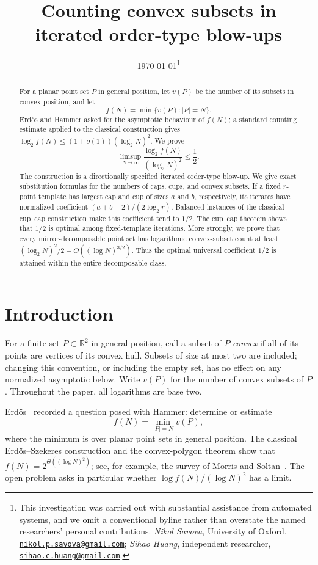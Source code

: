 \documentclass[11pt]{article}
\title{Counting convex subsets in iterated order-type blow-ups}
\author{}
\date{\today\thanks{This investigation was carried out with substantial
assistance from automated systems, and we omit a conventional byline rather
than overstate the named researchers' personal contributions.
\emph{Nikol Savova}, University of Oxford,
\href{mailto:nikol.p.savova@gmail.com}{\texttt{nikol.p.savova@gmail.com}};
\emph{Sihao Huang}, independent researcher,
\href{mailto:sihao.c.huang@gmail.com}{\texttt{sihao.c.huang@gmail.com}}.}}
\theoremstyle{remark}
\begin{document}
\maketitle

\begin{abstract}
For a planar point set $P$ in general position, let $v(P)$ be the number
of its subsets in convex position, and let
\[
 f(N)=\min\{v(P):|P|=N\}.
\]
Erd\H{o}s and Hammer asked for the asymptotic behaviour of $f(N)$; a
standard counting estimate applied to the classical construction gives
$\log_2 f(N)\le (1+o(1))(\log_2N)^2$.
We prove
\[
 \limsup_{N\to\infty}
 \frac{\log_2 f(N)}{(\log_2N)^2}\le\frac12.
\]
The construction is a directionally specified iterated order-type blow-up.
We give exact substitution formulas for the numbers of caps, cups, and
convex subsets.  If a fixed $r$-point template has largest cap and cup of
sizes $a$ and $b$, respectively, its iterates have normalized coefficient
$(a+b-2)/(2\log_2r)$.  Balanced instances of the classical cup--cap
construction make this coefficient tend to $1/2$.  The cup--cap theorem
shows that $1/2$ is optimal among fixed-template iterations.  More strongly,
we prove that every mirror-decomposable point set has logarithmic
convex-subset count at least
$(\log_2N)^2/2-O((\log N)^{3/2})$.  Thus the
optimal universal coefficient $1/2$ is attained within the entire
decomposable class.
\end{abstract}

\section{Introduction}

For a finite set $P\subset\mathbb R^2$ in general position, call a subset
of $P$ \emph{convex} if all of its points are vertices of its convex hull.
Subsets of size at most two are included; changing this convention, or
including the empty set, has no effect on any normalized asymptotic below.
Write $v(P)$ for the number of convex subsets of $P$.
Throughout the paper, all logarithms are base two.

Erd\H{o}s~\cite{Erdos1978} recorded a question posed with Hammer: determine
or estimate
\[
 f(N)=\min_{|P|=N}v(P),
\]
where the minimum is over planar point sets in general position.  The
classical Erd\H{o}s--Szekeres construction and the convex-polygon theorem
show that $f(N)=2^{\Theta((\log N)^2)}$; see, for example, the survey of
Morris and Soltan~\cite{MorrisSoltan2000}.  The open problem asks in
particular whether $\log f(N)/(\log N)^2$ has a limit.
\end{document}
